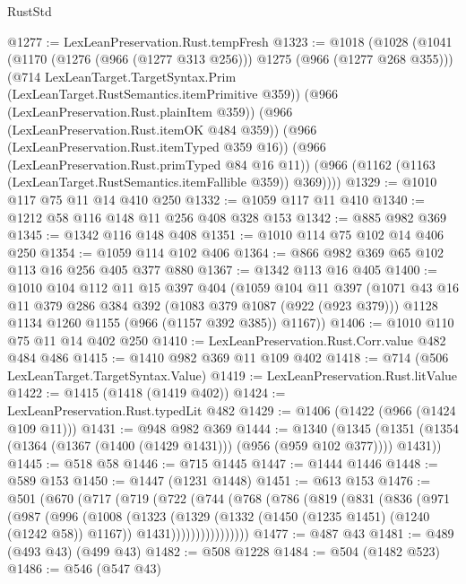 \begin{lexlean}{RustStd}
\begin{coremodule}
@1277 := LexLeanPreservation.Rust.tempFresh
@1323 := @1018
    (@1028
      (@1041
        (@1170 (@1276 (@966 (@1277 @313 @256))) @1275 (@966 (@1277 @268 @355)))
        (@714 LexLeanTarget.TargetSyntax.Prim (LexLeanTarget.RustSemantics.itemPrimitive @359))
        (@966 (LexLeanPreservation.Rust.plainItem @359))
        (@966 (LexLeanPreservation.Rust.itemOK @484 @359))
        (@966 (LexLeanPreservation.Rust.itemTyped @359 @16))
        (@966 (LexLeanPreservation.Rust.primTyped @84 @16 @11))
        (@966 (@1162 (@1163 (LexLeanTarget.RustSemantics.itemFallible @359)) @369))))
@1329 := @1010 @117 @75 @11 @14 @410 @250
@1332 := @1059 @117 @11 @410
@1340 := @1212 @58 @116 @148 @11 @256 @408 @328 @153
@1342 := @885 @982 @369
@1345 := @1342 @116 @148 @408
@1351 := @1010 @114 @75 @102 @14 @406 @250
@1354 := @1059 @114 @102 @406
@1364 := @866 @982 @369 @65 @102 @113 @16 @256 @405 @377 @880
@1367 := @1342 @113 @16 @405
@1400 := @1010
    @104
    @112
    @11
    @15
    @397
    @404
    (@1059
      @104
      @11
      @397
      (@1071
        @43
        @16
        @11
        @379
        @286
        @384
        @392
        (@1083 @379 @1087 (@922 (@923 @379)))
        @1128
        @1134
        @1260
        @1155
        (@966 (@1157 @392 @385))
        @1167))
@1406 := @1010 @110 @75 @11 @14 @402 @250
@1410 := LexLeanPreservation.Rust.Corr.value @482 @484 @486
@1415 := @1410 @982 @369 @11 @109 @402
@1418 := @714 (@506 LexLeanTarget.TargetSyntax.Value)
@1419 := LexLeanPreservation.Rust.litValue
@1422 := @1415 (@1418 (@1419 @402))
@1424 := LexLeanPreservation.Rust.typedLit @482
@1429 := @1406 (@1422 (@966 (@1424 @109 @11)))
@1431 := @948 @982 @369
@1444 := @1340
    (@1345 (@1351 (@1354 (@1364 (@1367 (@1400 (@1429 @1431))) (@956 (@959 @102 @377)))) @1431))
@1445 := @518 @58
@1446 := @715 @1445
@1447 := @1444 @1446
@1448 := @589 @153
@1450 := @1447 (@1231 @1448)
@1451 := @613 @153
@1476 := @501
    (@670
      (@717
        (@719
          (@722
            (@744
              (@768
                (@786
                  (@819
                    (@831
                      (@836
                        (@971
                          (@987
                            (@996
                              (@1008
                                (@1323
                                  (@1329
                                    (@1332 (@1450 (@1235 @1451) (@1240 (@1242 @58)) @1167))
                                    @1431))))))))))))))))
@1477 := @487 @43
@1481 := @489 (@493 @43) (@499 @43)
@1482 := @508 @1228
@1484 := @504 (@1482 @523)
@1486 := @546 (@547 @43)

\end{coremodule}
\end{lexlean}
